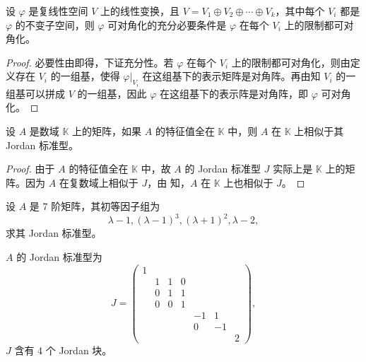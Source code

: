 \documentclass[../../main.tex]{subfiles}
\begin{document}
\begin{corollary}\label{corollary:线性变换可对角化关于在直和分解限制的充要条件}
设 $\varphi$ 是复线性空间 $V$ 上的线性变换，且 $V = V_1\oplus V_2\oplus\cdots\oplus V_k$，其中每个 $V_i$ 都是 $\varphi$ 的不变子空间，则 $\varphi$ 可对角化的充分必要条件是 $\varphi$ 在每个 $V_i$ 上的限制都可对角化。
\end{corollary}
\begin{proof}
必要性由即得，下证充分性。若 $\varphi$ 在每个 $V_i$ 上的限制都可对角化，则由定义存在 $V_i$ 的一组基，使得 $\varphi|_{V_i}$ 在这组基下的表示矩阵是对角阵。再由知 $V_i$ 的一组基可以拼成 $V$ 的一组基，因此 $\varphi$ 在这组基下的表示阵是对角阵，即 $\varphi$ 可对角化。

\end{proof}

\begin{corollary}
设 $A$ 是数域 $\mathbb{K}$ 上的矩阵，如果 $A$ 的特征值全在 $\mathbb{K}$ 中，则 $A$ 在 $\mathbb{K}$ 上相似于其 Jordan 标准型。
\end{corollary}
\begin{proof}
由于 $A$ 的特征值全在 $\mathbb{K}$ 中，故 $A$ 的 Jordan 标准型 $J$ 实际上是 $\mathbb{K}$ 上的矩阵。因为 $A$ 在复数域上相似于 $J$，由 知，$A$ 在 $\mathbb{K}$ 上也相似于 $J$。

\end{proof}

\begin{example}
设 $A$ 是 7 阶矩阵，其初等因子组为
\[
\lambda - 1, (\lambda - 1)^3, (\lambda + 1)^2, \lambda - 2,
\]
求其 Jordan 标准型。
\end{example}
\begin{solution}
$A$ 的 Jordan 标准型为
\[
J = \begin{pmatrix}
1 & & & & & & \\
& 1 & 1 & 0 & & & \\
& 0 & 1 & 1 & & & \\
& 0 & 0 & 1 & & & \\
& & & & -1 & 1 & \\
& & & & 0 & -1 & \\
& & & & & & 2
\end{pmatrix},
\]
$J$ 含有 4 个 Jordan 块。

\end{solution}
\end{document}

